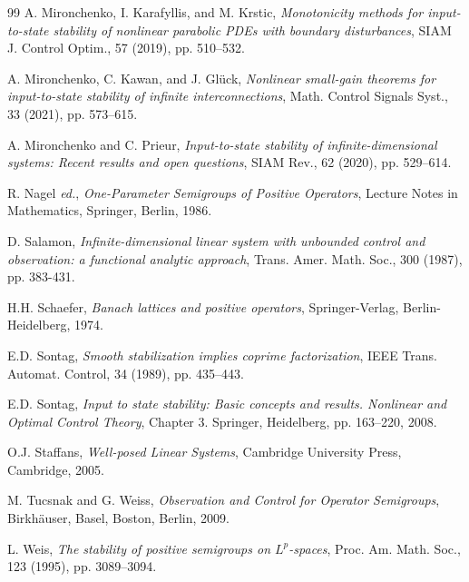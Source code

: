 \documentclass[onecolumn]{autart}
\numberwithin{equation}{section}
\begin{document}
\begin{thebibliography}{99}
		A. Mironchenko, I. Karafyllis, and M. Krstic, \emph{Monotonicity methods for input-to-state stability of nonlinear parabolic PDEs with boundary disturbances}, SIAM J. Control Optim., 57 (2019), pp. 510--532.

		A. Mironchenko, C. Kawan, and J. Gl\"{u}ck, \emph{Nonlinear small-gain theorems for input-to-state stability of infinite interconnections}, Math. Control Signals Syst., 33 (2021), pp. 573--615.
		
		A. Mironchenko and C. Prieur, \emph{Input-to-state stability of infinite-dimensional systems: Recent results and open questions}, SIAM Rev., 62 (2020), pp. 529--614.
		
		
		
		
		
		R. Nagel  \emph{ed.}, \emph{One-Parameter Semigroups of Positive Operators}, Lecture Notes in Mathematics, Springer, Berlin, 1986.
		
		D. Salamon, \emph{Infinite-dimensional linear system with unbounded control and observation: a functional analytic approach}, Trans. Amer. Math. Soc., 300 (1987), pp. 383-431.
		
		H.H. Schaefer, \emph{Banach lattices and positive operators}, Springer-Verlag, Berlin-Heidelberg, 1974.
		
		E.D. Sontag, \emph{Smooth stabilization implies coprime factorization}, IEEE Trans. Automat. Control, 34 (1989), pp. 435--443.
		
		E.D. Sontag, \emph{Input to state stability: Basic concepts and results. Nonlinear and Optimal Control Theory}, Chapter 3. Springer, Heidelberg, pp. 163--220, 2008.
		
		O.J. Staffans, \emph{Well-posed Linear Systems}, Cambridge University Press, Cambridge, 2005.

		
		M. Tucsnak and G. Weiss, \emph{Observation and Control for Operator Semigroups}, Birkh\"{a}user, Basel, Boston, Berlin, 2009.
		
		L. Weis, \emph{The stability of positive semigroups on $L^p$-spaces}, Proc. Am. Math. Soc., 123 (1995), pp. 3089--3094.
		

\end{thebibliography}
\end{document}
